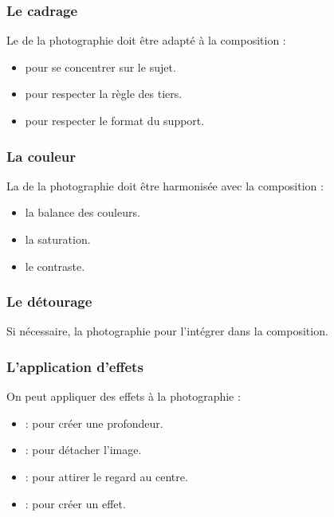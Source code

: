 \subsubsection{Le cadrage}

Le  de la photographie doit être adapté à la composition :

\begin{itemize}
    \item {} pour se concentrer sur le sujet.
    \item {} pour respecter la règle des tiers.
    \item {} pour respecter le format du support.
\end{itemize}

\subsubsection{La couleur}

La  de la photographie doit être harmonisée avec la composition :

\begin{itemize}
    \item {} la balance des couleurs.
    \item {} la saturation.
    \item {} le contraste.
\end{itemize}

\subsubsection{Le détourage}

Si nécessaire,  la photographie pour l'intégrer dans la composition.

\subsubsection{L'application d'effets}

On peut appliquer des effets à la photographie :

\begin{itemize}
    \item {} : pour créer une profondeur.
    \item {} : pour détacher l'image.
    \item {} : pour attirer le regard au centre.
    \item {} : pour créer un effet.
\end{itemize}


